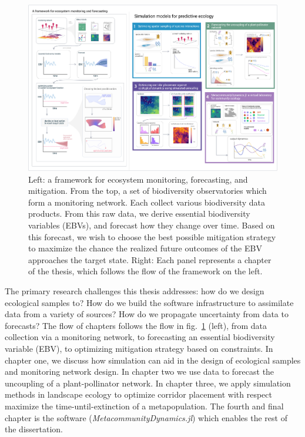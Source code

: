 \documentclass[10pt,oneside]{article}
\makeatletter
\def\maxwidth{\ifdim\Gin@nat@width>\linewidth\linewidth
\else\Gin@nat@width\fi}
\let\Oldincludegraphics\includegraphics
\renewcommand{\includegraphics}[1]{\Oldincludegraphics[width=\maxwidth]{#1}}
\makeatother
\begin{document}
\begin{figure}
\hypertarget{fig:thesis}{%
\centering
\includegraphics{./figures/thesisconcept.png}
\caption{Left: a framework for ecosystem monitoring, forecasting, and
mitigation. From the top, a set of biodiversity observatories which form
a monitoring network. Each collect various biodiversity data products.
From this raw data, we derive essential biodiversity variables (EBVs),
and forecast how they change over time. Based on this forecast, we wish
to choose the best possible mitigation strategy to maximize the chance
the realized future outcomes of the EBV approaches the target state.
Right: Each panel represents a chapter of the thesis, which follows the
flow of the framework on the left.}\label{fig:thesis}
}
\end{figure}

The primary research challenges this thesis addresses: how do we design
ecological samples to? How do we build the software infrastructure to
assimilate data from a variety of sources? How do we propagate
uncertainty from data to forecasts? The flow of chapters follows the
flow in fig.~\ref{fig:thesis} (left), from data collection via a
monitoring network, to forecasting an essential biodiversity variable
(EBV), to optimizing mitigation strategy based on constraints. In
chapter one, we discuss how simulation can aid in the design of
ecological samples and monitoring network design. In chapter two we use
data to forecast the uncoupling of a plant-pollinator network. In
chapter three, we apply simulation methods in landscape ecology to
optimize corridor placement with respect maximize the
time-until-extinction of a metapopulation. The fourth and final chapter
is the software (\emph{MetacommunityDynamics.jl}) which enables the rest
of the dissertation.
\end{document}
